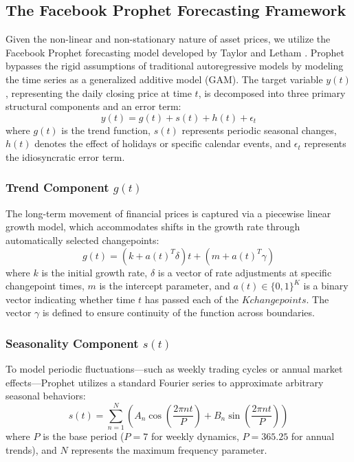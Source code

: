 \documentclass[11pt,twoside]{article}
\begin{document}
\subsection{The Facebook Prophet Forecasting Framework}
\label{SubSec:Prophet}

Given the non-linear and non-stationary nature of asset prices, we utilize the Facebook Prophet forecasting model developed by Taylor and Letham \cite{Taylor2018}. Prophet bypasses the rigid assumptions of traditional autoregressive models by modeling the time series as a generalized additive model (GAM). The target variable $y(t)$, representing the daily closing price at time $t$, is decomposed into three primary structural components and an error term:
\begin{equation}
y(t) = g(t) + s(t) + h(t) + \epsilon_t
\end{equation}
where $g(t)$ is the trend function, $s(t)$ represents periodic seasonal changes, $h(t)$ denotes the effect of holidays or specific calendar events, and $\epsilon_t$ represents the idiosyncratic error term.

\subsubsection{Trend Component \texorpdfstring{$g(t)$}{g(t)}}
The long-term movement of financial prices is captured via a piecewise linear growth model, which accommodates shifts in the growth rate through automatically selected changepoints:
\begin{equation}
g(t) = (k + a(t)^T \delta) t + (m + a(t)^T \gamma)
\end{equation}
where $k$ is the initial growth rate, $\delta$ is a vector of rate adjustments at specific changepoint times, $m$ is the intercept parameter, and $a(t) \in \{0,1\}^K$ is a binary vector indicating whether time $t$ has passed each of the $K changepoints$. The vector $\gamma$ is defined to ensure continuity of the function across boundaries.

\subsubsection{Seasonality Component \texorpdfstring{$s(t)$}{s(t)}}
To model periodic fluctuations—such as weekly trading cycles or annual market effects—Prophet utilizes a standard Fourier series to approximate arbitrary seasonal behaviors:
\begin{equation}
s(t) = \sum_{n=1}^{N} \left( A_n \cos\left(\frac{2\pi n t}{P}\right) + B_n \sin\left(\frac{2\pi n t}{P}\right) \right)
\end{equation}
where $P$ is the base period ($P = 7$ for weekly dynamics, $P = 365.25$ for annual trends), and $N$ represents the maximum frequency parameter.
\end{document}
